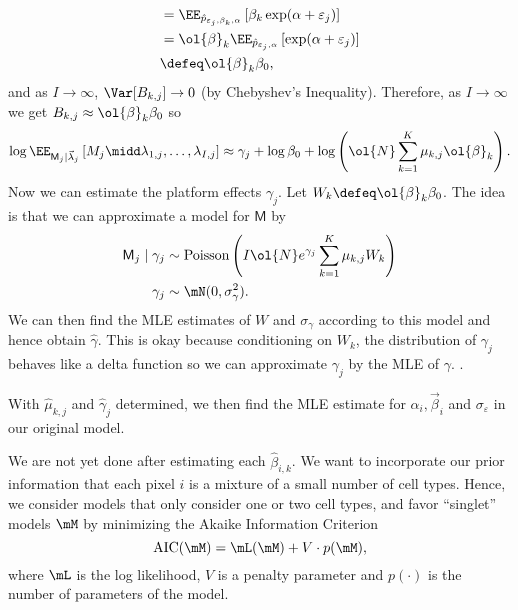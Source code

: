\begin{enumerate}
\begin{align*}
        &= \EE_{\hat{p}_{\varepsilon_{j}, \beta_k, \alpha}}\left[ \beta_k \exp(\alpha+\varepsilon_j) \right]
        \\
        &= \ol{\beta}_k\EE_{\hat{p}_{\varepsilon_{j}, \alpha}}\left[ \exp(\alpha+\varepsilon_j) \right]
        \\
        &\defeq \ol{\beta}_k\beta_0,
    \end{align*}
    and as $I\to \infty$, $\Var[B_{k, j}] \to 0$ (by Chebyshev's Inequality). Therefore, as $I \to \infty$ we get $B_{k, j} \approx \ol{\beta}_k \beta_0$ so
    \[
    \log \EE_{\mathsf{M}_j | \vec{\lambda}_j}\left[ M_j \midd  \lambda_{1, j}, \ldots, \lambda_{I, j} \right]
    \approx \gamma_j + \log \beta_0 + \log \left( \ol{N} \sum\limits_{k=1}^{K} \mu_{k, j}\ol{\beta}_k \right).
    \]
    Now we can estimate the platform effects $\gamma_j$. Let $W_k \defeq \ol{\beta}_k \beta_0$. The idea is that we can approximate a model for $\mathsf{M}$ by
    \begin{align*}
        \mathsf{M}_j \mid \gamma_j             
        &\sim \text{Poisson}\left( I\ol{N}e^{\gamma_j}\sum\limits_{k=1}^{K}\mu_{k, j}W_k \right)\\   
        \gamma_j &\sim \mN (0, \sigma_\gamma^2).    
    \end{align*}
    We can then find the MLE estimates of $W$ and $\sigma_\gamma$ according to this model and hence obtain $\hat{\gamma}$. This is okay because conditioning on $W_k$, the distribution of $\gamma_j$ behaves like a delta function so we can approximate $\gamma_j$ by the MLE of $\gamma$.
    \ii {}.

    With $\hat{\mu}_{k, j}$ and $\hat{\gamma}_j$ determined, we then find the MLE estimate for $\alpha_i, \vec{\beta}_i$ and $\sigma_\varepsilon$ in our original model.
\end{enumerate}
We are not yet done after estimating each $\hat{\beta}_{i, k}$. We want to incorporate our prior information that each pixel $i$ is a mixture of a small number of cell types. Hence, we consider models that only consider one or two cell types, and favor ``singlet'' models $\mM$ by minimizing the Akaike Information Criterion
\[
\text{AIC}(\mM) = \mL(\mM) + V\cdot p(\mM),
\]
where $\mL$ is the log likelihood, $V$ is a penalty parameter and $p(\cdot)$ is the number of parameters of the model.
